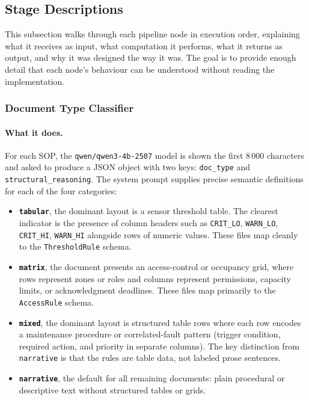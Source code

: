 ﻿\documentclass[11pt]{article}
\begin{document}
\subsection{Stage Descriptions}
\label{sec:stages}

This subsection walks through each pipeline node in execution order, explaining
what it receives as input, what computation it performs, what it returns as output,
and why it was designed the way it was.  The goal is to provide enough detail that
each node's behaviour can be understood without reading the implementation.

\subsubsection{Document Type Classifier}
\label{sec:classifier}

\paragraph{What it does.}

For each SOP, the \texttt{qwen/qwen3-4b-2507} model is shown the first
8\,000 characters and asked to produce a JSON object with two keys:
\texttt{doc\_type} and \texttt{structural\_reasoning}.  The system prompt
supplies precise semantic definitions for each of the four categories:

\begin{itemize}
    \item \textbf{\texttt{tabular}}, the dominant layout is a sensor threshold
          table.  The clearest indicator is the presence of column headers such as
          \texttt{CRIT\_LO}, \texttt{WARN\_LO}, \texttt{CRIT\_HI}, \texttt{WARN\_HI}
          alongside rows of numeric values.  These files map cleanly to the
          \texttt{ThresholdRule} schema.
    \item \textbf{\texttt{matrix}}, the document presents an access-control or
          occupancy grid, where rows represent zones or roles and columns represent
          permissions, capacity limits, or acknowledgment deadlines.  These files map
          primarily to the \texttt{AccessRule} schema.
    \item \textbf{\texttt{mixed}}, the dominant layout is structured table rows
          where each row encodes a maintenance procedure or correlated-fault pattern
          (trigger condition, required action, and priority in separate columns).
          The key distinction from \texttt{narrative} is that the rules are table
          data, not labeled prose sentences.
    \item \textbf{\texttt{narrative}}, the default for all remaining documents:
          plain procedural or descriptive text without structured tables or grids.
\end{itemize}
\end{document}
